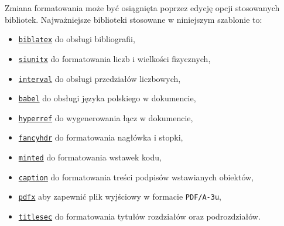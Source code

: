Zmiana formatowania może być osiągnięta poprzez edycję opcji stosowanych bibliotek. Najważniejsze biblioteki stosowane w niniejszym szablonie to:
\begin{itemize}
\item \texttt{\href{https://ctan.org/pkg/biblatex}{biblatex}} do obsługi bibliografii,
\item \texttt{\href{https://ctan.org/pkg/siunitx}{siunitx}} do formatowania liczb i wielkości fizycznych,
\item \texttt{\href{https://ctan.org/pkg/interval}{interval}} do obsługi przedziałów liczbowych,
\item \texttt{\href{https://ctan.org/pkg/babel-polish}{babel}} do obsługi języka polskiego w dokumencie,
\item \texttt{\href{https://ctan.org/pkg/hyperref}{hyperref}} do wygenerowania łącz w dokumencie,
\item \texttt{\href{https://ctan.org/pkg/hyperref}{fancyhdr}} do formatowania nagłówka i stopki,
\item \texttt{\href{https://ctan.org/pkg/minted}{minted}} do formatowania wstawek kodu,
\item \texttt{\href{https://ctan.org/pkg/caption}{caption}} do formatowania treści podpisów wstawianych obiektów,
\item \texttt{\href{https://ctan.org/pkg/pdfx}{pdfx}} aby zapewnić plik wyjściowy w formacie \texttt{PDF/A-3u},
\item \texttt{\href{https://ctan.org/pkg/titlesec}{titlesec}} do formatowania tytułów rozdziałów oraz podrozdziałów.
\end{itemize}
